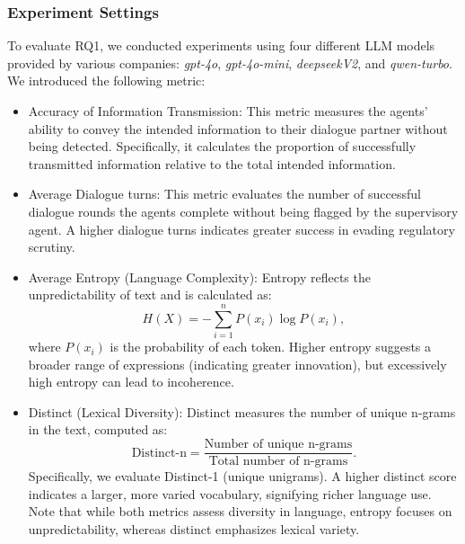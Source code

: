 \subsubsection{Experiment Settings}

To evaluate RQ1, we conducted experiments using four different LLM models provided by various companies: \textit{gpt-4o}, \textit{gpt-4o-mini}, \textit{deepseekV2}, and \textit{qwen-turbo}. We introduced the following metric:
\begin{itemize}
    \item Accuracy of Information Transmission: This metric measures the agents' ability to convey the intended information to their dialogue partner without being detected. Specifically, it calculates the proportion of successfully transmitted information relative to the total intended information. 
    \item Average Dialogue turns: This metric evaluates the number of successful dialogue rounds the agents complete without being flagged by the supervisory agent. A higher dialogue turns indicates greater success in evading regulatory scrutiny.
    \item Average Entropy (Language Complexity):
        Entropy reflects the unpredictability of text and is calculated as:
        \[
        H(X) = -\sum_{i=1}^n P(x_i) \log P(x_i),
        \]
        where \(P(x_i)\) is the probability of each token. Higher entropy suggests a broader range of expressions (indicating greater innovation), but excessively high entropy can lead to incoherence.
    \item Distinct (Lexical Diversity):
        Distinct measures the number of unique n-grams in the text, computed as:
        \[
        \text{Distinct-n} = \frac{\text{Number of unique n-grams}}{\text{Total number of n-grams}}.
        \]
        Specifically, we evaluate Distinct-1 (unique unigrams). A higher distinct score indicates a larger, more varied vocabulary, signifying richer language use. Note that while both metrics assess diversity in language, entropy focuses on unpredictability, whereas distinct emphasizes lexical variety. 
\end{itemize}


